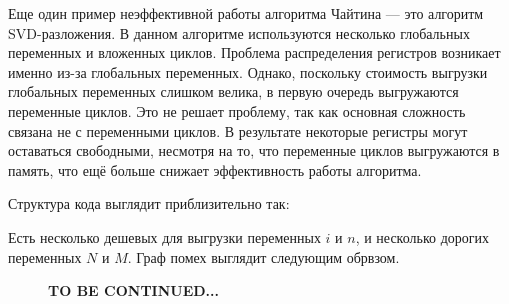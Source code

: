 \documentclass[12pt]{article}
\begin{document}
Еще один пример неэффективной работы алгоритма Чайтина — это алгоритм SVD-разложения.
В данном алгоритме используются несколько глобальных переменных и вложенных циклов.
Проблема распределения регистров возникает именно из-за глобальных переменных.  
Однако, поскольку стоимость выгрузки глобальных переменных слишком велика, в первую очередь выгружаются переменные циклов.
Это не решает проблему, так как основная сложность связана не с переменными циклов. 
В результате некоторые регистры могут оставаться свободными, несмотря на то, что переменные циклов выгружаются в память, что ещё больше снижает эффективность работы алгоритма.

Структура кода выглядит приблизительно так:

\begin{figure}[H]
    \centering
\end{figure}

Есть несколько дешевых для выгрузки переменных $i$ и $n$, и несколько дорогих переменных $N$ и $M$.
Граф помех выглядит следующим обрвзом.



\begin{figure}[H]
    \centering
    \textbf{TO BE CONTINUED...}
\end{figure}
\end{document}
